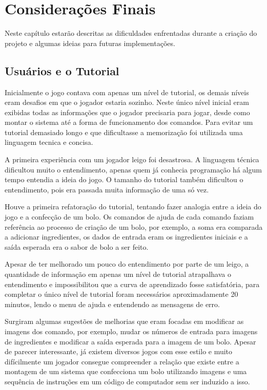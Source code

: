 \chapter{Considerações Finais}
\label{cap:Considerações Finais}

Neste capítulo estarão descritas as dificuldades enfrentadas durante a criação 
do projeto e algumas ideias para futuras implementações.

\section{Usuários e o Tutorial}

Inicialmente o jogo contava com apenas um nível de tutorial, os demais níveis 
eram desafios em que o jogador estaria sozinho. Neste único nível inicial eram
exibidas todas as informações que o jogador precisaria para jogar, desde como 
montar o sistema até a forma de funcionamento dos comandos. Para evitar um 
tutorial demasiado longo e que dificultasse a memorização foi utilizada uma 
linguagem tecnica e concisa.

A primeira experiência com um jogador leigo foi desastrosa. A linguagem técnica 
dificultou muito o entendimento, apenas quem já conhecia programação há algum 
tempo entendia a ideia do jogo. O tamanho do tutorial também dificultou o 
entendimento, pois era passada muita informação de uma só vez.

Houve a primeira refatoração do tutorial, tentando fazer analogia entre a ideia
do jogo e a confecção de um bolo. Os comandos de ajuda de cada comando faziam 
referência ao processo de criação de um bolo, por exemplo, a soma era comparada 
a adicionar ingredientes, os dados de entrada eram os ingredientes iniciais e 
a saída esperada era o sabor de bolo a ser feito.

Apesar de ter melhorado um pouco do entendimento por parte de um leigo, a
quantidade de informação em apenas um nível de tutorial atrapalhava o
entendimento e impossibilitou que a curva de aprendizado fosse satisfatória,
para completar o único nível de tutorial foram necessários aproximadamente 20
minutos, lendo o menu de ajuda e entendendo as mensagens de erro.

Surgiram algumas sugestões de melhorias que eram focadas em modificar as imagens
dos comando, por exemplo, mudar os números de entrada para imagens de 
ingredientes e modificar a saída esperada para a imagem de um bolo. Apesar de 
parecer interessante, já existem diversos jogos com esse estilo e muito 
difícilmente um jogador consegue compreender a relação que existe entre a 
montagem de um sistema que confecciona um bolo utilizando imagens e uma 
sequência de instruções em um código de computador sem ser induzido a isso.

